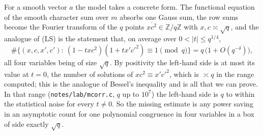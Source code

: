 \documentclass[11pt]{amsart}
\theoremstyle{definition}
\theoremstyle{remark}
\numberwithin{equation}{section}
\newcommand{\Z}{\mathbb Z}
\newcommand{\inv}[1]{\overline{#1}}
\begin{document}
For a smooth vector $a$ the model takes a concrete form.  The functional
equation of the smooth character sum over $m$ absorbs one Gauss sum, the
row sums become the Fourier transform of the $q$ points
$\inv{xc^2}\in\Z/q\Z$ with $x,c\asymp\sqrt q$, and the analogue of (LS) is
the statement that, on average over $0<|t|\le q^{1/4}$,
\[
 \#\bigl\{(x,c,x',c'):\ (1-txc^2)(1+tx'c'^2)\equiv1\pmod q\bigr\}
 =q\,\bigl(1+O(q^{-\delta})\bigr),
\]
all four variables being of size $\sqrt q$.  By positivity the left-hand
side is at most its value at $t=0$, the number of solutions of
$xc^2\equiv x'c'^2$, which is $\asymp q$ in the range computed; this is the
analogue of Bessel's inequality and is all that we can prove.  In that
range (\texttt{notes/lab/mcorr.c}, $q$ up to $10^7$) the left-hand side is
$q$ to within the statistical noise for every $t\ne0$.  So the missing estimate is any
power saving in an asymptotic count for one polynomial congruence in four
variables in a box of side exactly $\sqrt q$.
\end{document}
